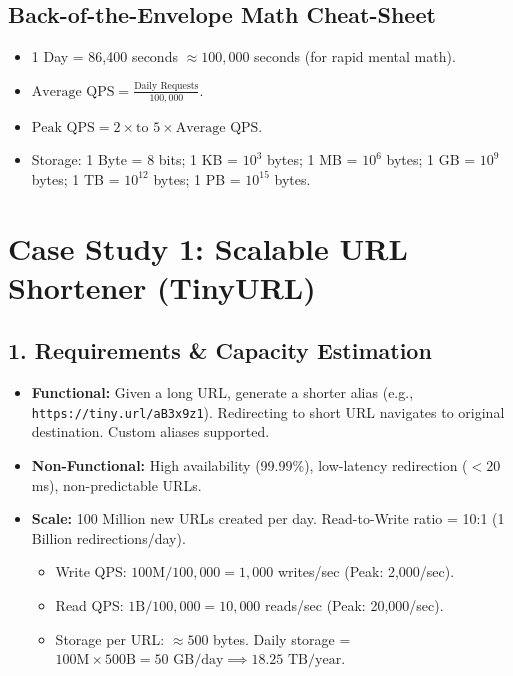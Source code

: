 \documentclass[10pt,journal,compsoc,onecolumn]{IEEEtran}
\begin{document}
\subsection{Back-of-the-Envelope Math Cheat-Sheet}
\begin{itemize}
    \item 1 Day = 86,400 seconds $\approx 100,000$ seconds (for rapid mental math).
    \item $\text{Average QPS} = \frac{\text{Daily Requests}}{100,000}$.
    \item $\text{Peak QPS} = 2 \times \text{to } 5 \times \text{Average QPS}$.
    \item Storage: 1 Byte = 8 bits; 1 KB = $10^3$ bytes; 1 MB = $10^6$ bytes; 1 GB = $10^9$ bytes; 1 TB = $10^{12}$ bytes; 1 PB = $10^{15}$ bytes.
\end{itemize}

\section{Case Study 1: Scalable URL Shortener (TinyURL)}
\label{sec:tinyurl}

\subsection{1. Requirements \& Capacity Estimation}
\begin{itemize}
    \item \textbf{Functional:} Given a long URL, generate a shorter alias (e.g., \texttt{https://tiny.url/aB3x9z1}). Redirecting to short URL navigates to original destination. Custom aliases supported.
    \item \textbf{Non-Functional:} High availability (99.99\%), low-latency redirection ($< 20$ms), non-predictable URLs.
    \item \textbf{Scale:} 100 Million new URLs created per day. Read-to-Write ratio = 10:1 (1 Billion redirections/day).
    \begin{itemize}
        \item Write QPS: $100\text{M} / 100,000 = 1,000$ writes/sec (Peak: 2,000/sec).
        \item Read QPS: $1\text{B} / 100,000 = 10,000$ reads/sec (Peak: 20,000/sec).
        \item Storage per URL: $\approx 500$ bytes. Daily storage = $100\text{M} \times 500\text{B} = 50\text{ GB/day} \implies 18.25\text{ TB/year}$.
    \end{itemize}
\end{itemize}
\end{document}
